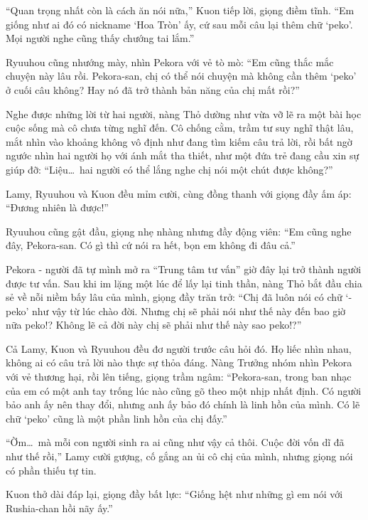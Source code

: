 \documentclass[../main.tex]{subfiles}
\begin{document}
``Quan trọng nhất còn là cách ăn nói nữa,'' Kuon tiếp lời, giọng điềm tĩnh. ``Em giống như ai đó có nickname `Hoa Tròn' ấy, cứ sau mỗi câu lại thêm chữ `peko'. Mọi người nghe cũng thấy chướng tai lắm.''

Ryuuhou cũng nhướng mày, nhìn Pekora với vẻ tò mò: ``Em cũng thắc mắc chuyện này lâu rồi. Pekora-san, chị có thể nói chuyện mà không cần thêm `peko' ở cuối câu không? Hay nó đã trở thành bản năng của chị mất rồi?''

Nghe được những lời từ hai người, nàng Thỏ dường như vừa vỡ lẽ ra một bài học cuộc sống mà cô chưa từng nghĩ đến. Cô chống cằm, trầm tư suy nghĩ thật lâu, mắt nhìn vào khoảng không vô định như đang tìm kiếm câu trả lời, rồi bất ngờ ngước nhìn hai người họ với ánh mắt tha thiết, như một đứa trẻ đang cầu xin sự giúp đỡ: ``Liệu\dots\ hai người có thể lắng nghe chị nói một chút được không?''

Lamy, Ryuuhou và Kuon đều mỉm cười, cùng đồng thanh với giọng đầy ấm áp: ``Đương nhiên là được!''

Ryuuhou cũng gật đầu, giọng nhẹ nhàng nhưng đầy động viên: ``Em cũng nghe đây, Pekora-san. Có gì thì cứ nói ra hết, bọn em không đi đâu cả.''

\ct

Pekora - người đã tự mình mở ra ``Trung tâm tư vấn'' giờ đây lại trở thành người được tư vấn. Sau khi im lặng một lúc để lấy lại tinh thần, nàng Thỏ bắt đầu chia sẻ về nỗi niềm bấy lâu của mình, giọng đầy trăn trở: ``Chị đã luôn nói có chữ `-peko' như vậy từ lúc chào đời. Nhưng chị sẽ phải nói như thế này đến bao giờ nữa peko!? Không lẽ cả đời này chị sẽ phải như thế này sao peko!?''

Cả Lamy, Kuon và Ryuuhou đều đơ người trước câu hỏi đó. Họ liếc nhìn nhau, không ai có câu trả lời nào thực sự thỏa đáng. Nàng Trưởng nhóm nhìn Pekora với vẻ thương hại, rồi lên tiếng, giọng trầm ngâm: ``Pekora-san, trong ban nhạc của em có một anh tay trống lúc nào cũng gõ theo một nhịp nhất định. Có người bảo anh ấy nên thay đổi, nhưng anh ấy bảo đó chính là linh hồn của mình. Có lẽ chữ `peko' cũng là một phần linh hồn của chị đấy.''

``Ờm\dots\ mà mỗi con người sinh ra ai cũng như vậy cả thôi. Cuộc đời vốn dĩ đã như thế rồi,'' Lamy cười gượng, cố gắng an ủi cô chị của mình, nhưng giọng nói có phần thiếu tự tin.


Kuon thở dài đáp lại, giọng đầy bất lực: ``Giống hệt như những gì em nói với Rushia-chan hồi nãy ấy.''
\end{document}
